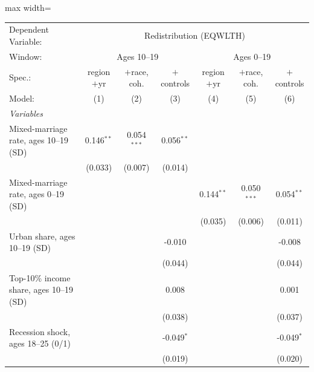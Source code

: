       \begin{adjustbox}{max width=\linewidth}
   \begin{tabular}{lcccccc}
      \tabularnewline \midrule \midrule
      Dependent Variable: & \multicolumn{6}{c}{Redistribution (EQWLTH)}\\
      Window: & \multicolumn{3}{c}{Ages 10--19} & \multicolumn{3}{c}{Ages 0--19} \\ 
      Spec.:                                   & region$+$yr  & $+$race, coh. & $+$controls  & region$+$yr  & $+$race, coh. & $+$controls \\   
      Model:                                   & (1)          & (2)           & (3)          & (4)          & (5)           & (6)\\  
      \midrule
      \emph{Variables}\\
      Mixed-marriage rate, ages 10--19 (SD)    & 0.146$^{**}$ & 0.054$^{***}$ & 0.056$^{**}$ &              &               &   \\   
                                               & (0.033)      & (0.007)       & (0.014)      &              &               &   \\   
      Mixed-marriage rate, ages 0--19 (SD)     &              &               &              & 0.144$^{**}$ & 0.050$^{***}$ & 0.054$^{**}$\\   
                                               &              &               &              & (0.035)      & (0.006)       & (0.011)\\   
      Urban share, ages 10--19 (SD)            &              &               & -0.010       &              &               & -0.008\\   
                                               &              &               & (0.044)      &              &               & (0.044)\\   
      Top-10\% income share, ages 10--19 (SD)  &              &               & 0.008        &              &               & 0.001\\   
                                               &              &               & (0.038)      &              &               & (0.037)\\   
      Recession shock, ages 18--25 (0/1)       &              &               & -0.049$^{*}$ &              &               & -0.049$^{*}$\\   
                                               &              &               & (0.019)      &              &               & (0.020)\\   

\end{tabular}
\end{adjustbox}
